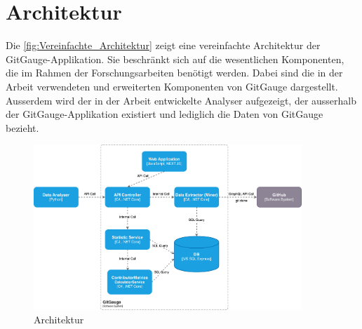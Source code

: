 \section{Architektur}
Die \autoref{fig:Vereinfachte_Architektur} zeigt eine vereinfachte Architektur der GitGauge-Applikation. Sie beschränkt sich auf die wesentlichen Komponenten, die im Rahmen der Forschungsarbeiten benötigt werden. Dabei sind die in der Arbeit verwendeten und erweiterten Komponenten von GitGauge dargestellt. Ausserdem wird der in der Arbeit entwickelte Analyser aufgezeigt, der ausserhalb der GitGauge-Applikation existiert und lediglich die Daten von GitGauge bezieht.  
\begin{figure}[htbp]
    \centering
    \includegraphics[width=0.9\textwidth]{Figures/Vereinfachte_Architektur.pdf}
    \caption{Architektur}
    \label{fig:Vereinfachte_Architektur}
\end{figure}

